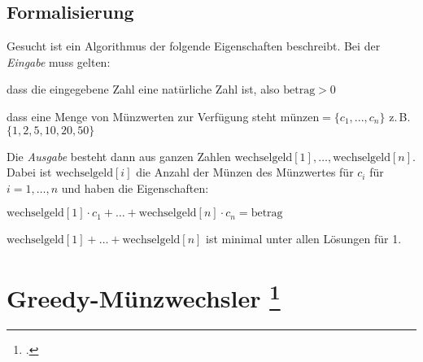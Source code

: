\documentclass{lehramt-informatik}
\begin{document}
\subsection{Formalisierung}

Gesucht ist ein Algorithmus der folgende Eigenschaften beschreibt.
Bei der \emph{Eingabe} muss gelten:

\bigskip

\begin{compactenum}
\item dass die eingegebene Zahl eine natürliche Zahl ist, also
$\text{betrag} > 0$

\item dass eine Menge von Münzwerten zur Verfügung steht $
\text{münzen}=\{c_1,...,c_n\}$ z.\,B. $\{1,2,5,10,20,50\}$
\end{compactenum}

\bigskip

\noindent
Die \emph{Ausgabe} besteht dann aus ganzen Zahlen
$\text{wechselgeld}[1], \ldots ,\text{wechselgeld}[n]$.
Dabei ist $\text{wechselgeld}[i] $ die Anzahl der Münzen
des Münzwertes für $ c_i $ für $ i=1,\ldots,n $ und haben die
Eigenschaften:

\bigskip

\begin{compactenum}
\item $\text{wechselgeld}[1] \cdot c_1 + \ldots +
\text{wechselgeld}[n] \cdot c_n = \text{betrag}$

\item $\text{wechselgeld}[1] + \ldots + \text{wechselgeld}[n] $
ist minimal unter allen Lösungen für 1.
\end{compactenum}

%

\begin{antwort}
\end{antwort}

%

\section{Greedy-Münzwechsler
\footcite[Seite 1, Aufgabe 1: Greedy-Münzwechsler]{aud:ab:3}}
\end{document}
